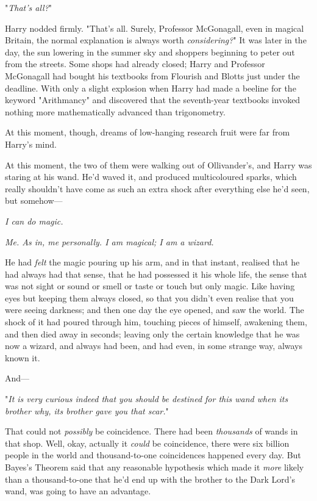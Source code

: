 "\emph{That's all?}"

Harry nodded firmly. "That's all. Surely, Professor McGonagall, even in magical 
Britain, the normal explanation is always worth \emph{considering?}"
\sbreak
It was later in the day, the sun lowering in the summer sky and shoppers 
beginning to peter out from the streets. Some shops had already closed; Harry 
and Professor McGonagall had bought his textbooks from Flourish and Blotts just 
under the deadline. With only a slight explosion when Harry had made a beeline 
for the keyword "Arithmancy" and discovered that the seventh-year textbooks 
invoked nothing more mathematically advanced than trigonometry.

At this moment, though, dreams of low-hanging research fruit were far from 
Harry's mind.

At this moment, the two of them were walking out of Ollivander's, and Harry was 
staring at his wand. He'd waved it, and produced multicoloured sparks, which 
really shouldn't have come as such an extra shock after everything else he'd 
seen, but somehow---

\emph{I can do magic.}

\emph{Me. As in, me personally. I am magical; I am a wizard.}

He had \emph{felt} the magic pouring up his arm, and in that instant, realised 
that he had always had that sense, that he had possessed it his whole life, the 
sense that was not sight or sound or smell or taste or touch but only magic. 
Like having eyes but keeping them always closed, so that you didn't even 
realise that you were seeing darkness; and then one day the eye opened, and saw 
the world. The shock of it had poured through him, touching pieces of himself, 
awakening them, and then died away in seconds; leaving only the certain 
knowledge that he was now a wizard, and always had been, and had even, in some 
strange way, always known it.

And---

"\emph{It is very curious indeed that you should be destined for this wand when 
its brother why, its brother gave you that scar.}"

That could not \emph{possibly} be coincidence. There had been \emph{thousands} 
of wands in that shop. Well, okay, actually it \emph{could} be coincidence, 
there were six billion people in the world and thousand-to-one coincidences 
happened every day. But Bayes's Theorem said that any reasonable hypothesis 
which made it \emph{more} likely than a thousand-to-one that he'd end up with 
the brother to the Dark Lord's wand, was going to have an advantage.

